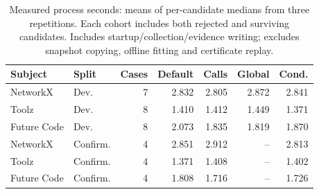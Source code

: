 \begin{table}[t]
\centering\small
\caption{Measured process seconds: means of per-candidate medians from three repetitions. Each cohort includes both rejected and surviving candidates. Includes startup/collection/evidence writing; excludes snapshot copying, offline fitting and certificate replay.}\label{tab:time}
\begin{tabular}{@{}llrrrrr@{}}
\toprule
Subject & Split & Cases & Default & Calls & Global & Cond.\\
\midrule
NetworkX & Dev. & 7 & 2.832 & 2.805 & 2.872 & 2.841\\
Toolz & Dev. & 8 & 1.410 & 1.412 & 1.449 & 1.371\\
Future Code & Dev. & 8 & 2.073 & 1.835 & 1.819 & 1.870\\
NetworkX & Confirm. & 4 & 2.851 & 2.912 & -- & 2.813\\
Toolz & Confirm. & 4 & 1.371 & 1.408 & -- & 1.402\\
Future Code & Confirm. & 4 & 1.808 & 1.716 & -- & 1.726\\
\bottomrule
\end{tabular}
\end{table}

